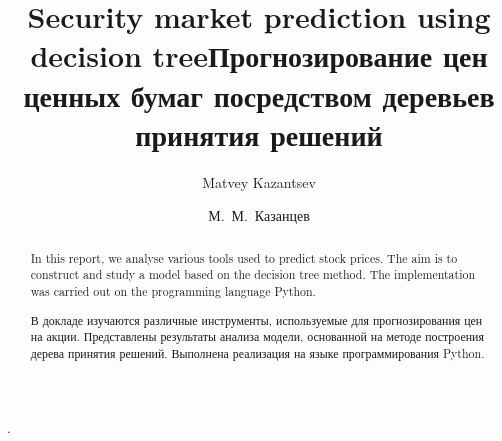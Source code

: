\begin{englishtitle}
\title{Security market prediction using decision tree}
\author{Matvey Kazantsev}

\maketitle

\begin{abstract}
In this report, we analyse various tools used to predict stock prices. The aim is to construct and study a model based on the decision tree method. The implementation was carried out on the  programming language Python.

\end{abstract}
\end{englishtitle}


\iffalse
\documentclass[12pt]{llncs}
\usepackage[T2A]{fontenc}
\usepackage[utf8]{inputenc}
\usepackage[english,russian]{babel}
\usepackage[russian]{nla}




\fi

\title{Прогнозирование цен ценных бумаг посредством деревьев принятия решений%
}
\author{М.~М.~Казанцев%
} 
.

\maketitle

\begin{abstract}
 В докладе изучаются различные инструменты, используемые  для прогнозирования цен на акции. Представлены результаты анализа модели, основанной на методе построения дерева принятия решений. Выполнена реализация на языке программирования Python. 

\end{abstract}

